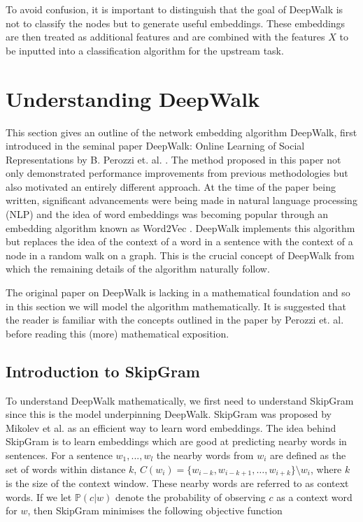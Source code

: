 \documentclass[a4paper]{article}
\renewcommand{\P}{\mathbb P}
\begin{document}
To avoid confusion, it is important to distinguish that the goal of DeepWalk is
not to classify the nodes but to generate useful embeddings. These embeddings
are then treated as additional features and are combined with the features $X$
to be inputted into a classification algorithm for the upstream task.
\section{Understanding DeepWalk}
This section gives an outline of the network embedding algorithm
DeepWalk, first introduced in the seminal paper DeepWalk: Online Learning of
Social Representations by B. Perozzi et. al. \cite{deepwalk}. The method proposed in
this paper not only demonstrated performance improvements from previous methodologies but
also motivated an entirely different approach. At the time of the paper being
written, significant advancements were being made in natural language processing (NLP)
and the idea of word embeddings was becoming popular through an embedding
algorithm known as Word2Vec \cite{mikolov2013efficient,mikolov2013distributed}.
DeepWalk implements this algorithm but replaces the idea of the context of a word in
a sentence with the context of a node in a random walk on a graph. This is the
crucial concept of DeepWalk from which the remaining details of the algorithm naturally follow.

The original paper on DeepWalk is lacking in a mathematical foundation and so in
this section we will model the algorithm mathematically. It is suggested that the reader
is familiar with the concepts outlined in the paper by Perozzi et. al. \cite{deepwalk} before reading this (more) mathematical exposition.
\subsection{Introduction to SkipGram}
To understand DeepWalk mathematically, we first need to understand SkipGram since this is the model underpinning DeepWalk. SkipGram was
proposed by Mikolev et al. \cite{mikolov2013efficient} as an efficient way to
learn word embeddings. The idea behind SkipGram is to learn embeddings which are good at
predicting nearby words in sentences. For a sentence $w_1, ... , w_l$ the
nearby words from $w_i$ are defined as the set of words
within distance $k$, $C(w_i) = \{w_{i-k}, w_{i-k+1}, \dots , w_{i+k}\} \setminus w_i$, where $k$ is the size of the context window. These nearby words are referred to as context words. If we let $\P(c|w)$ denote the probability of observing $c$ as a context word for $w$, then SkipGram
minimises the following objective function
\end{document}
